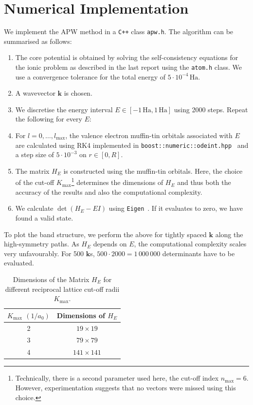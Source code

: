 \documentclass[a4paper,DIV=12,english]{scrartcl}
\begin{document}
\section{Numerical Implementation}
We implement the APW method in a \texttt{C++} class \texttt{apw.h}. The algorithm can be summarised as follows:
\begin{enumerate}
    \item The core potential is obtained by solving the self-consistency equations for the ionic problem as described in the last report using the \texttt{atom.h} class. We use a convergence tolerance for the total energy of $5\cdot 10^{-4}\,\text{Ha}$.
    \item A wavevector $\textbf{k}$ is chosen.
    \item We discretise the energy interval $E\in[-1\,\text{Ha}, 1\,\text{Ha}]$ using 2000 steps. Repeat the following for every $E$:
    \item For $l=0,\dots,l_\text{max}$, the valence electron muffin-tin orbitals associated with $E$ are calculated using RK4 implemented in \texttt{boost::numeric::odeint.hpp}~\cite{BoostLibrary} and a step size of $5\cdot 10^{-3}$ on $r\in[0, R]$.
    \item The matrix $H_E$ is constructed using the muffin-tin orbitals. Here, the choice of the cut-off $K_\text{max}$\footnote{Technically, there is a second parameter used here, the cut-off index $n_\text{max}=6$. However, experimentation suggests that no vectors were missed using this choice.} determines the dimensions of $H_E$ and thus both the accuracy of the results and also the computational complexity.
    \item We calculate $\det(H_E - EI)$ using \texttt{Eigen}~\cite{eigenweb}. If it evaluates to zero, we have found a valid state.
\end{enumerate}
To plot the band structure, we perform the above for tightly spaced $\textbf{k}$ along the high-symmetry paths. As $H_E$ depends on $E$, the computational complexity scales very unfavourably. For 500 $\textbf{k}$s, $500 \cdot 2000 = 1\,000\,000$ determinants have to be evaluated. 
\begin{table}
    \centering 
    \caption{Dimensions of the Matrix $H_E$ for different reciprocal lattice cut-off radii $K_\text{max}$.}
    \vspace{0.25cm}
    \begin{tabular}{c|c}
        $K_\text{max}$ $(1/a_0)$ & Dimensions of $H_E$ \\
        \hline 
        2 & $19 \times 19$ \\
        3 & $79 \times 79$ \\
        4 & $141 \times 141$        
    \end{tabular}
    \label{tab:matsize}
\end{table}
\end{document}

